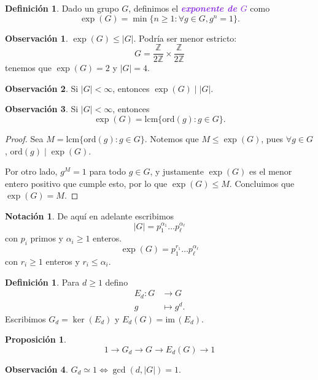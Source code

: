 \documentclass{article}
\newtheorem{proposition}[theorem]{Proposición}
\theoremstyle{definition}
\newtheorem{definition}[theorem]{Definición}
\newtheorem*{notation}{Notación}
\newtheorem*{obs}{Observación}
\theoremstyle{remark}
\numberwithin{equation}{section}
\newcommand{\Z}{\mathbb{Z}}
\renewcommand{\a}{\alpha}
\newcommand{\oo}{\infty}
\newcommand{\im}{\mathrm{im}\,}
\newcommand{\ord}{\mathrm{ord}}
\newcommand{\lcm}{\mathrm{lcm}}
\newcommand{\abs}[1]{\left| #1 \right|}
\newcommand{\znz}[1]{\frac{\Z}{#1 \Z}}
\newcommand{\olon}{\colon}
\newcommand{\wea}[1]{\textcolor{BlueViolet}{\textbf{\emph{#1}}}}
\begin{document}
\begin{definition}
  Dado un grupo $G$, definimos el \wea{exponente de $G$} como
  \[\exp(G) = \min\{n \geq 1 \colon \forall g \in G, g^n = 1\}.\]
\end{definition}

\begin{obs}
  $\exp(G) \leq \abs G$. Podría ser menor estricto:
  \[G = \znz2 \times \znz2\]
  tenemos que $\exp(G) = 2$ y $\abs G = 4$.
\end{obs}

\begin{obs}
  Si $\abs G < \oo$, entonces $\exp(G) \mid \abs G$.
\end{obs}

\newpage %
\begin{obs}
  Si $\abs G < \oo$, entonces
  \[\exp(G) = \lcm\{\ord(g) \colon g \in G\}.\]
\end{obs}
\begin{proof}
  Sea $M = \lcm\{\ord(g) \colon g \in G\}$. Notemos que $M \leq \exp(G)$, pues $\forall g \in G$, $\ord(g) \mid \exp(G)$.

  Por otro lado, $g^M = 1$ para todo $g \in G$, y justamente $\exp(G)$ es el menor entero positivo que cumple esto, por lo que $\exp(G) \leq M$. Concluimos que $\exp(G) = M$.
\end{proof}

\begin{notation}
  De aquí en adelante escribimos
  \[\abs G = p_1^{\a_1} \dots p_\ell^{\a_\ell}\]
  con $p_i$ primos y $\a_i \geq 1$ enteros.
  \[\exp(G) = p_1^{r_1} \dots p_\ell^{\a_\ell}\]
  con $r_i \geq 1$ enteros y $r_i \leq \a_i$.
\end{notation}

\begin{definition}
  Para $d \geq 1$ defino
  \begin{align*}
    E_d \olon G &\to G \\
    g &\mapsto g^d.
  \end{align*}
  Escribimos $G_d = \ker(E_d)$ y $E_d(G) = \im(E_d)$.
\end{definition}

\begin{proposition}
  \[1 \to G_d \to G \to E_d(G) \to 1\]
\end{proposition}

\begin{obs}
  $G_d \simeq 1 \iff \gcd(d,\abs G) = 1$.
\end{obs}
\end{document}
